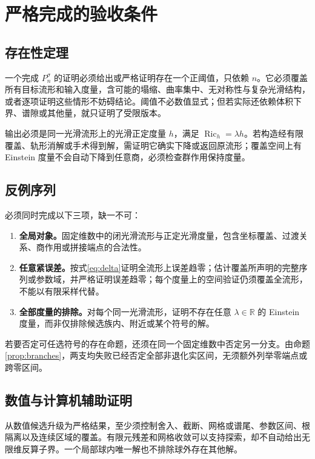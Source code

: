 \documentclass[11pt,a4paper]{article}
\theoremstyle{definition}
\newcommand{\Ric}{\operatorname{Ric}}
\begin{document}
\section{严格完成的验收条件}\label{sec:acceptance}

\subsection{存在性定理}

一个完成 $P_n^\sigma$ 的证明必须给出或严格证明存在一个正阈值，只依赖 $n$。它必须覆盖所有目标流形和输入度量，含可能的塌缩、曲率集中、无对称性与复杂光滑结构，或者逐项证明这些情形不妨碍结论。阈值不必数值显式；但若实际还依赖体积下界、谱隙或其他量，就只证明了受限版本。

输出必须是同一光滑流形上的光滑正定度量 $h$，满足 $\Ric_h=\lambda h$。若构造经有限覆盖、轨形消解或手术得到解，需证明它确实下降或返回原流形；覆盖空间上有 Einstein 度量不会自动下降到任意商，必须检查群作用保持度量。

\subsection{反例序列}

必须同时完成以下三项，缺一不可：
\begin{enumerate}
\item \textbf{全局对象。}固定维数中的闭光滑流形与正定光滑度量，包含坐标覆盖、过渡关系、商作用或拼接端点的合法性。
\item \textbf{任意紧误差。}按式\eqref{eq:delta}证明全流形上误差趋零；估计覆盖所声明的完整序列或参数域，并严格证明误差趋零；每个度量上的空间验证仍须覆盖全流形，不能以有限采样代替。
\item \textbf{全部度量的排除。}对每个同一光滑流形，证明不存在任意 $\lambda\in\mathbb R$ 的 Einstein 度量，而非仅排除候选族内、附近或某个符号的解。
\end{enumerate}
若要否定可任选符号的存在命题，还须在同一个固定维数中否定另一分支。由命题\ref{prop:branches}，两支均失败已经否定全部非退化实区间，无须额外列举零端点或跨零区间。

\subsection{数值与计算机辅助证明}

从数值候选升级为严格结果，至少须控制舍入、截断、网格或谱尾、参数区间、根隔离以及连续区域的覆盖。有限元残差和网格收敛可以支持探索，却不自动给出无限维反算子界。一个局部球内唯一解也不排除球外存在其他解。
\end{document}
